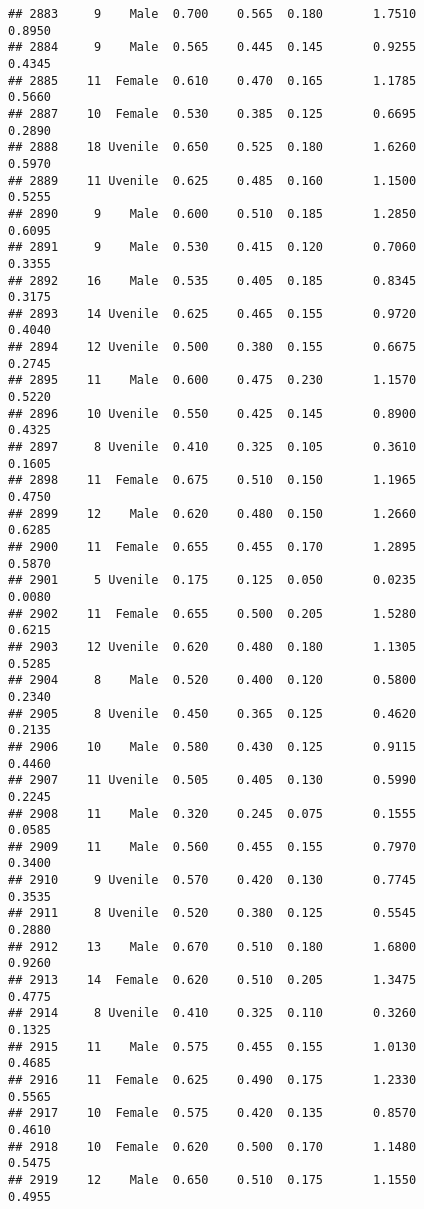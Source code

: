 \documentclass[
]{article}
\begin{document}
\begin{verbatim}
## 2883     9    Male  0.700    0.565  0.180       1.7510         0.8950
## 2884     9    Male  0.565    0.445  0.145       0.9255         0.4345
## 2885    11  Female  0.610    0.470  0.165       1.1785         0.5660
## 2887    10  Female  0.530    0.385  0.125       0.6695         0.2890
## 2888    18 Uvenile  0.650    0.525  0.180       1.6260         0.5970
## 2889    11 Uvenile  0.625    0.485  0.160       1.1500         0.5255
## 2890     9    Male  0.600    0.510  0.185       1.2850         0.6095
## 2891     9    Male  0.530    0.415  0.120       0.7060         0.3355
## 2892    16    Male  0.535    0.405  0.185       0.8345         0.3175
## 2893    14 Uvenile  0.625    0.465  0.155       0.9720         0.4040
## 2894    12 Uvenile  0.500    0.380  0.155       0.6675         0.2745
## 2895    11    Male  0.600    0.475  0.230       1.1570         0.5220
## 2896    10 Uvenile  0.550    0.425  0.145       0.8900         0.4325
## 2897     8 Uvenile  0.410    0.325  0.105       0.3610         0.1605
## 2898    11  Female  0.675    0.510  0.150       1.1965         0.4750
## 2899    12    Male  0.620    0.480  0.150       1.2660         0.6285
## 2900    11  Female  0.655    0.455  0.170       1.2895         0.5870
## 2901     5 Uvenile  0.175    0.125  0.050       0.0235         0.0080
## 2902    11  Female  0.655    0.500  0.205       1.5280         0.6215
## 2903    12 Uvenile  0.620    0.480  0.180       1.1305         0.5285
## 2904     8    Male  0.520    0.400  0.120       0.5800         0.2340
## 2905     8 Uvenile  0.450    0.365  0.125       0.4620         0.2135
## 2906    10    Male  0.580    0.430  0.125       0.9115         0.4460
## 2907    11 Uvenile  0.505    0.405  0.130       0.5990         0.2245
## 2908    11    Male  0.320    0.245  0.075       0.1555         0.0585
## 2909    11    Male  0.560    0.455  0.155       0.7970         0.3400
## 2910     9 Uvenile  0.570    0.420  0.130       0.7745         0.3535
## 2911     8 Uvenile  0.520    0.380  0.125       0.5545         0.2880
## 2912    13    Male  0.670    0.510  0.180       1.6800         0.9260
## 2913    14  Female  0.620    0.510  0.205       1.3475         0.4775
## 2914     8 Uvenile  0.410    0.325  0.110       0.3260         0.1325
## 2915    11    Male  0.575    0.455  0.155       1.0130         0.4685
## 2916    11  Female  0.625    0.490  0.175       1.2330         0.5565
## 2917    10  Female  0.575    0.420  0.135       0.8570         0.4610
## 2918    10  Female  0.620    0.500  0.170       1.1480         0.5475
## 2919    12    Male  0.650    0.510  0.175       1.1550         0.4955

\end{verbatim}
\end{document}
